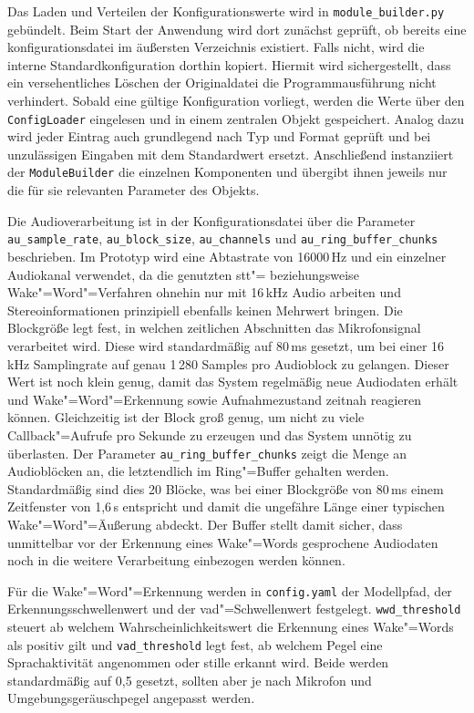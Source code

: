 Das Laden und Verteilen der Konfigurationswerte wird in \texttt{module\_builder.py} gebündelt.
Beim Start der Anwendung wird dort zunächst geprüft, ob bereits eine konfigurationsdatei im äußersten Verzeichnis existiert. Falls nicht, wird die interne Standardkonfiguration dorthin kopiert. Hiermit wird sichergestellt, dass ein versehentliches Löschen der Originaldatei die Programmausführung nicht verhindert. Sobald eine gültige Konfiguration vorliegt, werden die Werte über den \texttt{ConfigLoader} eingelesen und in einem zentralen Objekt gespeichert. Analog dazu wird jeder Eintrag auch grundlegend nach Typ und Format geprüft und bei unzulässigen Eingaben mit dem Standardwert ersetzt. Anschließend instanziiert der \texttt{ModuleBuilder} die einzelnen Komponenten und übergibt ihnen jeweils nur die für sie relevanten Parameter des Objekts.

Die Audioverarbeitung ist in der Konfigurationsdatei über die Parameter \texttt{au\_sample\_rate}, \texttt{au\_block\_size}, \texttt{au\_channels} und \texttt{au\_ring\_buffer\_chunks} beschrieben. Im Prototyp wird eine Abtastrate von 16000\,Hz und ein einzelner Audiokanal verwendet, da die genutzten \gls{stt}"= beziehungsweise Wake"=Word"=Verfahren ohnehin nur mit 16\,kHz Audio arbeiten und Stereoinformationen prinzipiell ebenfalls keinen Mehrwert bringen. Die Blockgröße legt fest, in welchen zeitlichen Abschnitten das Mikrofonsignal verarbeitet wird. Diese wird standardmäßig auf 80\,ms gesetzt, um bei einer 16\,kHz Samplingrate auf genau 1\,280 Samples pro Audioblock zu gelangen. Dieser Wert ist noch klein genug, damit das System regelmäßig neue Audiodaten erhält und Wake"=Word"=Erkennung sowie Aufnahmezustand zeitnah reagieren können. Gleichzeitig ist der Block groß genug, um nicht zu viele Callback"=Aufrufe pro Sekunde zu erzeugen und das System unnötig zu überlasten. Der Parameter \texttt{au\_ring\_buffer\_chunks} zeigt die Menge an Audioblöcken an, die letztendlich im Ring"=Buffer gehalten werden. Standardmäßig sind dies 20 Blöcke, was bei einer Blockgröße von 80\,ms einem Zeitfenster von 1,6\,s entspricht und damit die ungefähre Länge einer typischen Wake"=Word"=Äußerung abdeckt. Der Buffer stellt damit sicher, dass unmittelbar vor der Erkennung eines Wake"=Words gesprochene Audiodaten noch in die weitere Verarbeitung einbezogen werden können.

Für die Wake"=Word"=Erkennung werden in \texttt{config.yaml} der Modellpfad, der Erkennungsschwellenwert und der \gls{vad}"=Schwellenwert festgelegt. \texttt{wwd\_threshold} steuert ab welchem Wahrscheinlichkeitswert die Erkennung eines Wake"=Words als positiv gilt und \texttt{vad\_threshold} legt fest, ab welchem Pegel eine Sprachaktivität angenommen oder stille erkannt wird. Beide werden standardmäßig auf 0,5 gesetzt, sollten aber je nach Mikrofon und Umgebungsgeräuschpegel angepasst werden.

